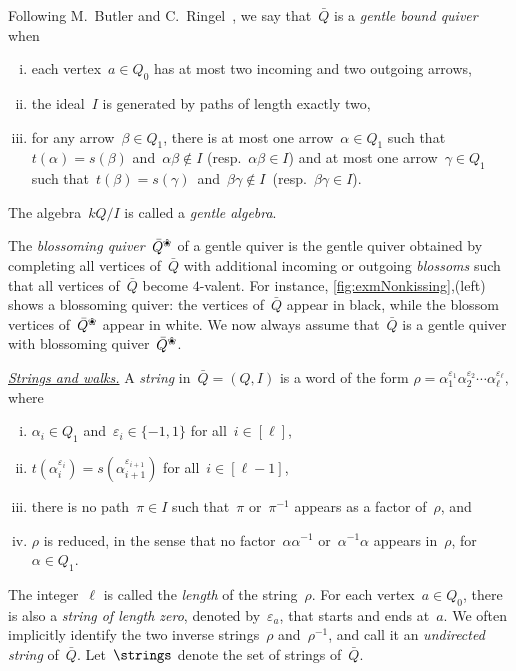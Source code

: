 \documentclass{amsart}
\theoremstyle{definition}
\newcommand{\darkblue}{\color{darkblue}} %
\newcommand{\defn}[1]{\textsl{\darkblue #1}} %
\newcommand{\para}[1]{\medskip\noindent\uline{\textit{#1.}}} %
\newcommand{\quiver}{\bar Q} %
\newcommand{\blossom}{^\text{\ding{96}}} %
\begin{document}
Following M.~Butler and C.~Ringel~\cite{ButlerRingel}, we say that~$\quiver$ is a \defn{gentle bound quiver} when
\begin{enumerate}[(i)]
\item each vertex~$a \in Q_0$ has at most two incoming and two outgoing arrows,
\item the ideal~$I$ is generated by paths of length exactly two,
\item for any arrow~$\beta \in Q_1$, there is at most one arrow~$\alpha \in Q_1$ such that~$t(\alpha) = s(\beta)$ and~${\alpha\beta\notin I}$ (resp.~$\alpha\beta \in I$) and at most one arrow~$\gamma \in Q_1$ such that~$t(\beta) = s(\gamma)$~and~${\beta\gamma\notin I}$~(resp.~${\beta\gamma \in I}$).
\end{enumerate}
The algebra~$kQ/I$ is called a \defn{gentle algebra}.

The \defn{blossoming quiver}~$\quiver\blossom$ of a gentle quiver is the gentle quiver obtained by completing all vertices of~$\quiver$ with additional incoming or outgoing \defn{blossoms} such that all vertices of~$\quiver$ become $4$-valent.
For instance, \cref{fig:exmNonkissing},(left) shows a blossoming quiver: the vertices of~$\quiver$ appear in black, while the blossom vertices of~$\quiver\blossom$ appear in white.
We now always assume that~$\quiver$ is a gentle quiver with blossoming quiver~$\quiver\blossom$.

\para{Strings and walks}
%
A \defn{string} in~$\quiver = (Q,I)$ is a word of the form
\(
\rho = \alpha_1^{\varepsilon_1}\alpha_2^{\varepsilon_2}\cdots \alpha_\ell^{\varepsilon_\ell},
\)
where
	\begin{enumerate}[(i)]
	\item $\alpha_i \in Q_1$ and~$\varepsilon_i \in \{-1,1\}$ for all~$i \in [\ell]$,
	\item $t(\alpha_i^{\varepsilon_i}) = s(\alpha_{i+1}^{\varepsilon_{i+1}})$ for all~$i \in [\ell-1]$,
	\item there is no path~$\pi \in I$ such that~$\pi$ or~$\pi^{-1}$ appears as a factor of~$\rho$, and
	\item $\rho$ is reduced, in the sense that no factor~$\alpha\alpha^{-1}$ or~$\alpha^{-1}\alpha$ appears in~$\rho$, for~$\alpha \in Q_1$.
	\end{enumerate}
The integer~$\ell$ is called the \defn{length} of the string~$\rho$.
For each vertex~$a \in Q_0$, there is also a \defn{string of length zero}, denoted by~$\varepsilon_a$, that starts and ends at~$a$.
We often implicitly identify the two inverse strings~$\rho$ and~$\rho^{-1}$, and call it an \defn{undirected string} of~$\quiver$.
Let~$\strings$ denote the set of strings of~$\quiver$.
\end{document}
